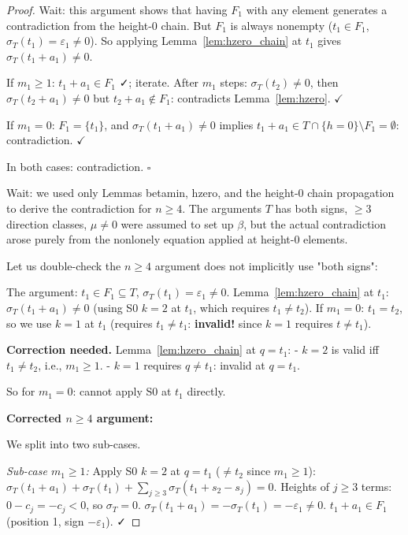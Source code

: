\begin{proof}
Wait: this argument shows that having $F_1$ with any element generates a contradiction
from the height-0 chain.  But $F_1$ is always nonempty ($t_1 \in F_1$, $\sigma_T(t_1)=\varepsilon_1 \neq 0$).
So applying Lemma~\ref{lem:hzero_chain} at $t_1$ gives $\sigma_T(t_1+a_1)\neq 0$.

If $m_1 \geq 1$: $t_1+a_1 \in F_1$ ✓; iterate.  After $m_1$ steps: $\sigma_T(t_2)\neq 0$,
then $\sigma_T(t_2+a_1)\neq 0$ but $t_2+a_1\notin F_1$: contradicts Lemma~\ref{lem:hzero}. $\checkmark$

If $m_1 = 0$: $F_1 = \{t_1\}$, and $\sigma_T(t_1+a_1)\neq 0$ implies $t_1+a_1 \in T\cap\{h=0\}\setminus F_1=\emptyset$: contradiction. $\checkmark$

In both cases: contradiction. $\square$

\medskip

Wait: we used only Lemmas betamin, hzero, and the height-0 chain propagation to derive the
contradiction for $n \geq 4$.  The arguments $T$ has both signs, $\geq 3$ direction classes,
$\mu \neq 0$ were assumed to set up $\beta$, but the actual contradiction arose purely from the
nonlonely equation applied at height-$0$ elements.

Let us double-check the $n \geq 4$ argument does not implicitly use "both signs":

The argument: $t_1 \in F_1 \subseteq T$, $\sigma_T(t_1)=\varepsilon_1 \neq 0$.
Lemma~\ref{lem:hzero_chain} at $t_1$: $\sigma_T(t_1+a_1)\neq 0$ (using S0 $k=2$ at $t_1$,
which requires $t_1 \neq t_2$).  If $m_1=0$: $t_1=t_2$, so we use $k=1$ at $t_1$
(requires $t_1 \neq t_1$: \textbf{invalid!} since $k=1$ requires $t \neq t_1$).

\textbf{Correction needed.} Lemma~\ref{lem:hzero_chain} at $q=t_1$:
- $k=2$ is valid iff $t_1 \neq t_2$, i.e., $m_1 \geq 1$.
- $k=1$ requires $q \neq t_1$: invalid at $q=t_1$.

So for $m_1=0$: cannot apply S0 at $t_1$ directly.

\medskip
\noindent\textbf{Corrected $n \geq 4$ argument:}

We split into two sub-cases.

\medskip
\noindent\emph{Sub-case $m_1 \geq 1$:}
Apply S0 $k=2$ at $q = t_1$ ($\neq t_2$ since $m_1 \geq 1$):
$\sigma_T(t_1+a_1) + \sigma_T(t_1) + \sum_{j \geq 3} \sigma_T(t_1+s_2-s_j) = 0$.
Heights of $j \geq 3$ terms: $0-c_j=-c_j<0$, so $\sigma_T=0$.
$\sigma_T(t_1+a_1) = -\sigma_T(t_1) = -\varepsilon_1 \neq 0$.
$t_1+a_1 \in F_1$ (position 1, sign $-\varepsilon_1$). ✓


\end{proof}
